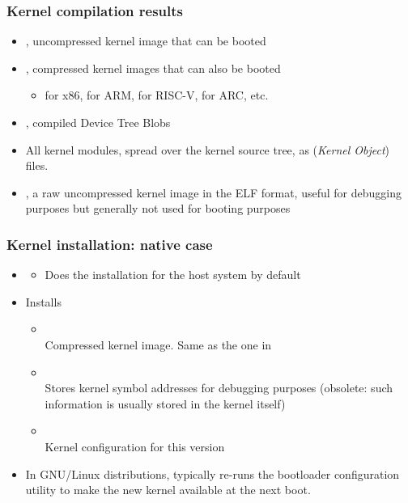 \begin{frame}
  \frametitle{Kernel compilation results}
  \begin{itemize}
    \item {}, uncompressed kernel image that
      can be booted
    \item {}, compressed kernel images that
      can also be booted
      \begin{itemize}
      \item {} for x86,  for ARM,
       for RISC-V,  for ARC, etc.
      \end{itemize}
    \item {}, compiled Device Tree Blobs
    \item All kernel modules, spread over the kernel source tree, as
       ({\em Kernel Object}) files.
    \item {}, a raw uncompressed kernel image in the ELF
      format, useful for debugging purposes but generally not used for
      booting purposes
  \end{itemize}
\end{frame}

\begin{frame}
  \frametitle{Kernel installation: native case}
  \begin{itemize}
  \item {}
    \begin{itemize}
    \item Does the installation for the host system by default
    \end{itemize}
  \item Installs
    \begin{itemize}
    \item {} \\
      Compressed kernel image. Same as the one in
    \item {}\\
      Stores kernel symbol addresses for debugging purposes
      (obsolete: such information is usually stored in the kernel itself)
    \item {}\\
      Kernel configuration for this version
    \end{itemize}
  \item In GNU/Linux distributions, typically re-runs the bootloader configuration
    utility to make the new kernel available at the next boot.
  \end{itemize}
\end{frame}

